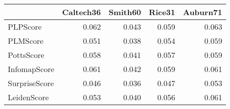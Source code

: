 \begin{tabular}{lrrrr}
\toprule
{} & Caltech36 & Smith60 & Rice31 & Auburn71 \\
\midrule
PLPScore      &     0.062 &   0.043 &  0.059 &    0.063 \\
PLMScore      &     0.051 &   0.038 &  0.054 &    0.059 \\
PottsScore    &     0.058 &   0.041 &  0.057 &    0.059 \\
InfomapScore  &     0.061 &   0.042 &  0.059 &    0.061 \\
SurpriseScore &     0.046 &   0.036 &  0.047 &    0.053 \\
LeidenScore   &     0.053 &   0.040 &  0.056 &    0.061 \\
\bottomrule
\end{tabular}
